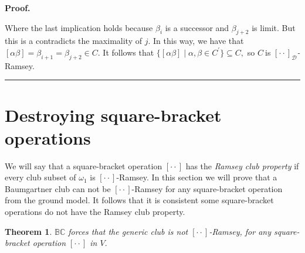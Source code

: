 \documentclass{article}
\newtheorem{theorem}{Theorem}
\newenvironment{proof}[1][Proof]{\noindent\textbf{#1.} }{\ \rule{0.5em}{0.5em}}
\begin{document}
\begin{proof}
\qquad\qquad\qquad\ \ 

Where the last implication holds because $\beta_{i}$ is a successor and
$\beta_{j+2}$ is limit. But this is a contradicts the maximality of $j.$ In
this way, we have that $\left[  \alpha\beta\right]  =\beta_{i+1}=\beta
_{j+2}\in C.$ It follows that $\{\left[  \alpha\beta\right]  \mid\alpha
,\beta\in C^{\prime}\}\subseteq C,$ so $C\ $is $[\cdot\cdot]_{\mathcal{D}}%
$\emph{-}Ramsey.
\end{proof}

\section{Destroying square-bracket operations \label{Destroying square}}

We will say that a square-bracket operation $[\cdot\cdot]$ has the
\emph{Ramsey club property }if every club subset of $\omega_{1}$ is
$[\cdot\cdot]$-Ramsey. In this section we will prove that a Baumgartner club
can not be $[\cdot\cdot]$-Ramsey for any square-bracket operation from the
ground model. It follows that it is consistent some square-bracket operations
do not have the Ramsey club property.

\begin{theorem}
$\mathbb{BC}$ forces that the generic club is not $[\cdot\cdot]$-Ramsey, for
any square-bracket operation $[\cdot\cdot]$ in $V.$ \label{Teo BC destruve V}
\end{theorem}
\end{document}
